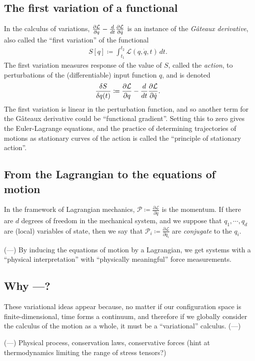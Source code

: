 \documentclass[11pt,a4paper]{memoir}
\newcommand{\fancyL}{\mathcal{L}}
\newcommand{\fancyP}{\mathcal{P}}
\newcommand{\Part}[2]{\frac{\partial #1}{\partial #2}}
\begin{document}
\subsection{The first variation of a functional}
In the calculus of variations, $\gateauxlagrangian$ is an instance of the \textit{G\^ateaux derivative}, also called the ``first variation'' of
the functional
\begin{align*}
    S[q] \coloneqq \int_{t_1}^{t_2} \fancyL(q, \dot{q}, t)\,dt.
\end{align*}
The first variation measures response of the value of $S$, called the \textit{action}, to perturbations of the (differentiable) input function $q$,
and is denoted
\begin{equation}
    \frac{\delta S}{\delta q(t)} \coloneqq \gateauxlagrangian.
\end{equation}
The first variation is linear in the perturbation function, and so another term for the G\^ateaux derivative could be ``functional gradient''.
Setting this to zero gives the Euler-Lagrange equations, and the practice of determining trajectories of motions as stationary curves of the action is called the ``principle of stationary action''.

\subsection{From the Lagrangian to the equations of motion}
In the framework of Lagrangian mechanics, $\fancyP \coloneqq \Part{\fancyL}{\dot{q}}$ is the momentum. If there are $d$ degrees of freedom
in the mechanical system, and we suppose that $q_1,\cdots,q_d$ are (local) variables of state, then we say that $\fancyP_i \coloneqq \Part{\fancyL}{\dot{q}_i}$
are \textit{conjugate} to the $q_i$.

(---) By inducing the equations of motion by a Lagrangian, we get systems with a ``physical interpretation'' with ``physically meaningful'' force measurements.

\subsection{Why ---?}
These variational ideas appear because, no matter if our configuration space is finite-dimensional, time forms a continuum, and therefore if we
globally consider the calculus of the motion as a whole, it must be a ``variational'' calculus. (---)

(---) Physical process, conservation laws, conservative forces (hint at thermodynamics limiting the range of stress tensors?)
\end{document}
